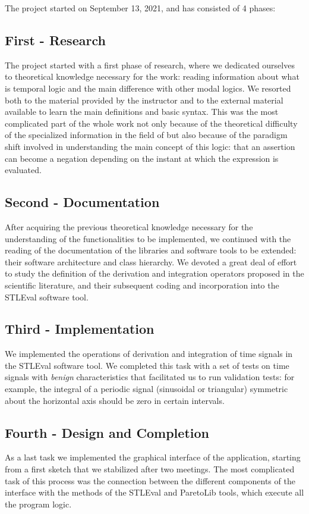 The project started on September 13, 2021, and has consisted of 4 phases:


\subsection{First - Research}
The project started with a first phase of research, where we dedicated ourselves to theoretical knowledge necessary for the work: reading information about what is temporal logic and the main difference with other modal logics.
We resorted both to the material provided by the instructor and to the external material available to learn the main definitions and basic syntax.
This was the most complicated part of the whole work not only because of the theoretical difficulty of the specialized information in the field of 
but also because of the paradigm shift involved in understanding the main concept of this logic: that an assertion can become a negation depending on the instant at which the expression is evaluated.


\subsection{Second - Documentation}
After acquiring the previous theoretical knowledge necessary for the understanding of the functionalities to be implemented, we continued with the reading of the documentation of the libraries and software tools to be extended: their software architecture and class hierarchy. We devoted a great deal of effort to study the definition of the derivation and integration operators proposed in the scientific literature, and their subsequent coding and incorporation into the STLEval software tool.

\subsection{Third - Implementation}
We implemented the operations of derivation and integration of time signals in the STLEval software tool. We completed this task with a set of tests on time signals with \textit{benign} characteristics that facilitated us to run validation tests: for example, the integral of a periodic signal (sinusoidal or triangular) symmetric about the horizontal axis should be zero in  certain intervals.

\subsection{Fourth - Design and Completion}
As a last task we implemented the graphical interface of the application, starting from a first sketch that we stabilized after two meetings. The most complicated task of this process was the connection between the different components of the interface with the methods of the STLEval and ParetoLib tools, which execute all the program logic.

